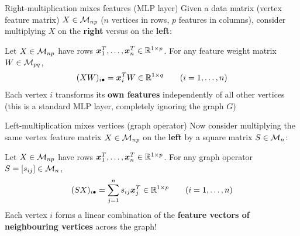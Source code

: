 \documentclass[aspectratio=169]{beamer}\usepackage[]{graphicx}\usepackage[]{xcolor}
\begin{document}
\begin{frame}{Right-multiplication mixes features (MLP layer)}
Given a data matrix (vertex feature matrix) $X \in \mathcal{M}_{np}$ ($n$ vertices in rows, $p$ features in columns), consider multiplying $X$ on the \textbf{right} versus on the \textbf{left}:
\vfill
\begin{importantproperty}
\label{prop:left-vs-right}
Let $X \in \mathcal{M}_{np}$ have rows $\bm{x}_1^T, \ldots, \bm{x}_n^T \in \mathbb{R}^{1 \times p}$.
For any feature weight matrix $W \in \mathcal{M}_{pq}$,
\[
(XW)_{i\bullet} = \bm{x}_i^T W \in \mathbb{R}^{1 \times q} \qquad (i = 1, \ldots, n)
\]
Each vertex $i$ transforms its \textbf{own features} independently of all other vertices (this is a standard MLP layer, completely ignoring the graph $G$)
\end{importantproperty}
\end{frame}


\begin{frame}{Left-multiplication mixes vertices (graph operator)}
Now consider multiplying the same vertex feature matrix $X \in \mathcal{M}_{np}$ on the \textbf{left} by a square matrix $S \in \mathcal{M}_n$:
\vfill
\begin{importantproperty}
Let $X \in \mathcal{M}_{np}$ have rows $\bm{x}_1^T, \ldots, \bm{x}_n^T \in \mathbb{R}^{1 \times p}$.
For any graph operator $S = [s_{ij}] \in \mathcal{M}_n$,
\[
(SX)_{i\bullet} = \sum_{j=1}^n s_{ij} \bm{x}_j^T \in \mathbb{R}^{1 \times p} \qquad (i = 1, \ldots, n)
\]
Each vertex $i$ forms a linear combination of the \textbf{feature vectors of neighbouring vertices} across the graph!
\end{importantproperty}
\end{frame}
\end{document}

